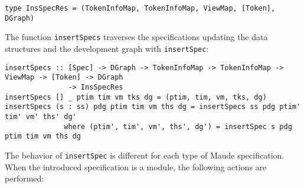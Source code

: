 \begin{itemize}
{\codesize
\begin{verbatim}
type InsSpecRes = (TokenInfoMap, TokenInfoMap, ViewMap, [Token], DGraph)
\end{verbatim}
}

\end{itemize}

The function \verb"insertSpecs" traverses the specifications updating the
data structures and the development graph with \verb"insertSpec":

{\codesize
\begin{verbatim}
insertSpecs :: [Spec] -> DGraph -> TokenInfoMap -> TokenInfoMap -> ViewMap -> [Token] -> DGraph
               -> InsSpecRes
insertSpecs [] _ ptim tim vm tks dg = (ptim, tim, vm, tks, dg)
insertSpecs (s : ss) pdg ptim tim vm ths dg = insertSpecs ss pdg ptim' tim' vm' ths' dg'
              where (ptim', tim', vm', ths', dg') = insertSpec s pdg ptim tim vm ths dg
\end{verbatim}
}

The behavior of \verb"insertSpec" is different for each type of Maude
specification. When the introduced specification is a module, the
following actions are performed:

